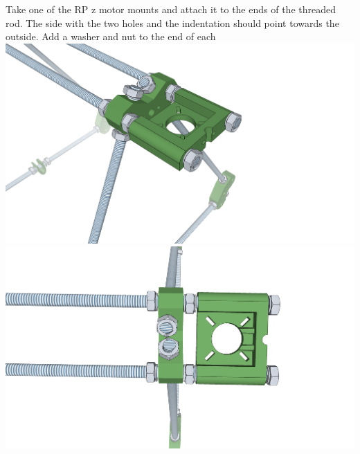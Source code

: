 \documentclass[twoside,a4paper,titlepage]{memoir}
\begin{document}
	\section{}
	Take one of the RP z motor mounts and attach it to the ends of the threaded rod. The side with the two
	holes and the indentation should point towards the outside. Add a washer and nut to the end of each
	\includegraphics[width=1\linewidth]{graphics/ch4_5_1.png}
	\includegraphics[width=1\linewidth]{graphics/ch4_5_2.png}
	
\end{document}
